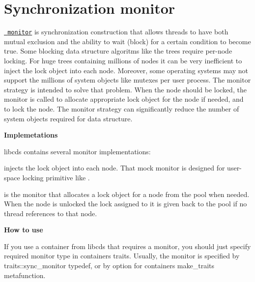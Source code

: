 \chapter{Synchronization monitor}
\hypertarget{cds_sync_monitor}{}\label{cds_sync_monitor}
 \href{http://en.wikipedia.org/wiki/Monitor_\%28synchronization\%29}{\texttt{ monitor}} is synchronization construction that allows threads to have both mutual exclusion and the ability to wait (block) for a certain condition to become true. Some blocking data structure algoritms like the trees require per-\/node locking. For huge trees containing millions of nodes it can be very inefficient to inject the lock object into each node. Moreover, some operating systems may not support the millions of system objects like mutexes per user process. The monitor strategy is intended to solve that problem. When the node should be locked, the monitor is called to allocate appropriate lock object for the node if needed, and to lock the node. The monitor strategy can significantly reduce the number of system objects required for data structure.

{\bfseries{Implemetations}}

{\ttfamily libcds} contains several monitor implementations\+:
\begin{DoxyItemize}
\item {\ttfamily {}} injects the lock object into each node. That mock monitor is designed for user-\/space locking primitive like .
\item {\ttfamily {}} is the monitor that allocates a lock object for a node from the pool when needed. When the node is unlocked the lock assigned to it is given back to the pool if no thread references to that node.
\end{DoxyItemize}

{\bfseries{How to use}}

If you use a container from {\ttfamily libcds} that requires a monitor, you should just specify required monitor type in container\textquotesingle{}s traits. Usually, the monitor is specified by {\ttfamily traits\+::sync\+\_\+monitor} typedef, or by {\ttfamily {}} option for container\textquotesingle{}s {\ttfamily make\+\_\+traits} metafunction.

